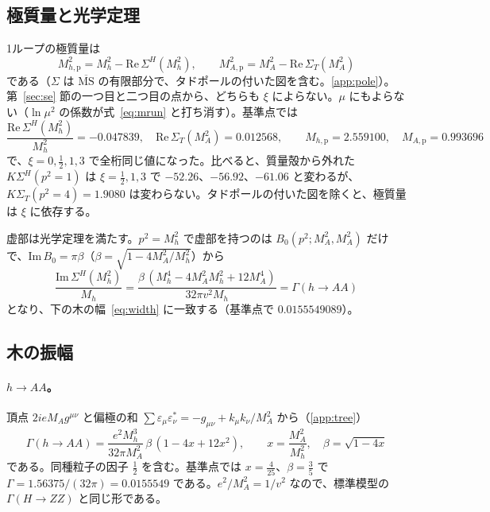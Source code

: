 \documentclass[a4paper,10pt]{ltjsarticle}
\newcommand{\MSbar}{\overline{\mathrm{MS}}}
\newcommand{\re}{\mathrm{Re}\,}
\newcommand{\im}{\mathrm{Im}\,}
\begin{document}
\subsection{極質量と光学定理}\label{sec:pole}

1ループの極質量は
\begin{equation}
M_{h,\mathrm p}^2=M_h^2-\re\Sigma^H(M_h^2),\qquad M_{A,\mathrm p}^2=M_A^2-\re\Sigma_T(M_A^2)
\label{eq:pole}
\end{equation}
である（$\Sigma$ は $\MSbar$ の有限部分で、タドポールの付いた図を含む。\ref{app:pole}）。第~\ref{sec:se} 節の一つ目と二つ目の点から、どちらも $\xi$ によらない。$\mu$ にもよらない（$\ln\mu^2$ の係数が式~\eqref{eq:mrun} と打ち消す）。基準点では
\begin{equation}
\frac{\re\Sigma^H(M_h^2)}{M_h^2}=-0.047839,\quad \re\Sigma_T(M_A^2)=0.012568,\qquad
M_{h,\mathrm p}=2.559100,\quad M_{A,\mathrm p}=0.993696
\label{eq:polenum}
\end{equation}
で、$\xi=0,\frac12,1,3$ で全桁同じ値になった。比べると、質量殻から外れた $K\Sigma^H(p^2=1)$ は $\xi=\frac12,1,3$ で $-52.26$、$-56.92$、$-61.06$ と変わるが、$K\Sigma_T(p^2=4)=1.9080$ は変わらない。タドポールの付いた図を除くと、極質量は $\xi$ に依存する。

虚部は光学定理を満たす。$p^2=M_h^2$ で虚部を持つのは $B_0(p^2;M_A^2,M_A^2)$ だけで、$\im B_0=\pi\beta$（$\beta=\sqrt{1-4M_A^2/M_h^2}$）から
\begin{equation}
\frac{\im\Sigma^H(M_h^2)}{M_h}=\frac{\beta\,(M_h^4-4M_A^2M_h^2+12M_A^4)}{32\pi v^2M_h}=\Gamma(h\to AA)
\label{eq:optical}
\end{equation}
となり、下の木の幅~\eqref{eq:width} に一致する（基準点で $0.0155549089$）。

\subsection{木の振幅}\label{sec:tree}

\paragraph{$h\to AA$。}頂点 $2ieM_Ag^{\mu\nu}$ と偏極の和 $\sum\varepsilon_\mu\varepsilon_\nu^*=-g_{\mu\nu}+k_\mu k_\nu/M_A^2$ から（\ref{app:tree}）
\begin{equation}
\Gamma(h\to AA)=\frac{e^2M_h^3}{32\pi M_A^2}\,\beta\,(1-4x+12x^2),\qquad x=\frac{M_A^2}{M_h^2},\quad \beta=\sqrt{1-4x}
\label{eq:width}
\end{equation}
である。同種粒子の因子 $\frac12$ を含む。基準点では $x=\frac4{25}$、$\beta=\frac35$ で $\Gamma=1.56375/(32\pi)=0.0155549$ である。$e^2/M_A^2=1/v^2$ なので、標準模型の $\Gamma(H\to ZZ)$ と同じ形である。
\end{document}
